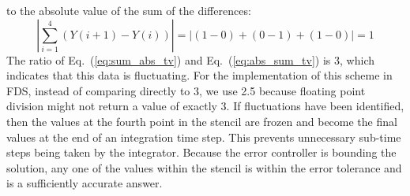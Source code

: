 to the absolute value of the sum of the differences:
\begin{equation}\label{eq:abs_sum_tv}
|\displaystyle \sum_{i=1}^{4}(Y(i+1)-Y(i))| = |(1-0)+(0-1)+(1-0)| = 1
\end{equation}
The ratio of Eq.~(\ref{eq:sum_abs_tv}) and Eq.~(\ref{eq:abs_sum_tv}) is 3, which indicates that this data is fluctuating. For the implementation of this scheme in FDS, instead of comparing directly to 3, we use 2.5 because floating point division might not return a value of exactly 3. If fluctuations have been identified, then the values at the fourth point in the stencil are frozen and become the final values at the end of an integration time step. This prevents unnecessary sub-time steps being taken by the integrator. Because the error controller is bounding the solution, any one of the values within the stencil is within the error tolerance and is a sufficiently accurate answer.   

